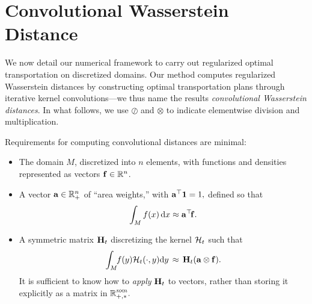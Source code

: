 \section{Convolutional Wasserstein Distance}



We now detail our numerical framework to carry out regularized optimal transportation on discretized domains.  Our method computes %
regularized Wasserstein distances by constructing optimal transportation plans through iterative kernel convolutions---we thus name the results \emph{convolutional Wasserstein distances}.  In what follows, we use $\oslash$ and $\otimes$ to indicate elementwise division and multiplication.


Requirements for computing convolutional distances are minimal:
\begin{itemize}%
\item The domain $M$, discretized into $n$ elements, with functions
and densities represented as vectors $\mathbf{f}\in\mathbb{R}^n$.
\item A vector $\mathbf a\in\mathbb{R}_+^n$ of ``area weights,'' with $\mathbf a^\top\mathbf 1=1,$ defined so that
$$\int_M f(x)\,\mathrm{d} x \approx \mathbf a^\top\!\mathbf{f}.$$
\item %
A symmetric matrix $\mathbf{H}_t$ discretizing the kernel $\mathcal H_t$ such that %
\[
	\int_M \hspace{-1mm}f(y) \mathcal H_t(\cdot,y) \mathrm{d} y \,\approx\, \mathbf{H}_t(\mathbf a\otimes\mathbf{f}).
\]
It is sufficient to know how to \emph{apply} $\mathbf{H}_t$ to vectors, rather than storing it explicitly as a matrix in $\mathbb{R}^{n\!\times\!n}_{+,*}.$
\end{itemize}

